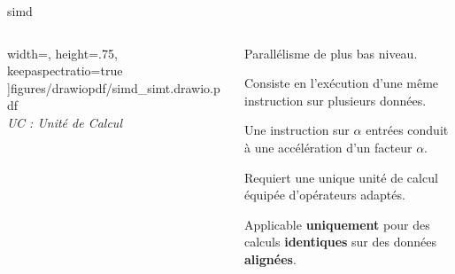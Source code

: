 \documentclass[../main.tex]{subfiles}
\begin{document}
\begin{frame}{\acrfull{simd}}
\begin{columns}
\begin{column}{.3\linewidth}
        width=\linewidth,
        height=.75\textheight,
        keepaspectratio=true
      ]{figures/drawiopdf/simd_simt.drawio.pdf}\\
      {\small \itshape UC : Unité de Calcul}
    \end{column}
    \begin{column}{.7\linewidth}
      \begin{ctrlitemize}{.5 em}
        \item Parallélisme de plus bas niveau.
        \item Consiste en l'exécution d'une même instruction sur plusieurs données.
        \item Une instruction sur $\alpha$ entrées conduit à une accélération d'un facteur $\alpha$.
      \end{ctrlitemize}

      \vspace{2 em}

      \begin{ctrlitemize}{.5 em}
        \item Requiert une unique unité de calcul équipée d'opérateurs adaptés.
        \item Applicable \textbf{uniquement} pour des calculs \textbf{identiques} sur des données \textbf{alignées}.
      \end{ctrlitemize}
    \end{column}
  \end{columns}
\end{frame}
\end{document}
